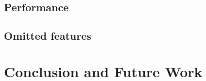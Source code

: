 \documentclass[pdftex,english,10pt,b5paper,twoside]{book}
\begin{document}
\section{Performance}

\section{Omitted features}

\chapter{Conclusion and Future Work}




\appendix
\appendixpage
\addappheadtotoc
\end{document}
